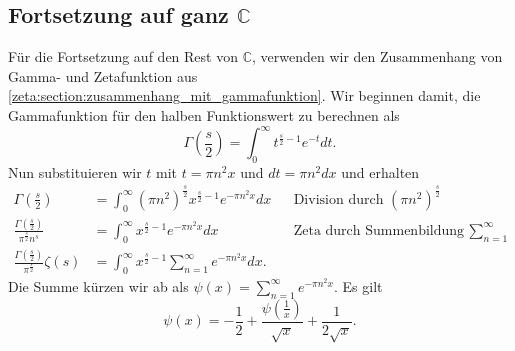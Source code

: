 \subsection{Fortsetzung auf ganz $\mathbb{C}$} \label{zeta:subsection:auf_ganz}
Für die Fortsetzung auf den Rest von $\mathbb{C}$, verwenden wir den Zusammenhang von Gamma- und Zetafunktion aus \ref{zeta:section:zusammenhang_mit_gammafunktion}.
Wir beginnen damit, die Gammafunktion für den halben Funktionswert zu berechnen als
\begin{equation}
    \Gamma \left( \frac{s}{2} \right)
    =
    \int_0^{\infty} t^{\frac{s}{2}-1} e^{-t} dt.
\end{equation}
Nun substituieren wir $t$ mit $t = \pi n^2 x$ und $dt=\pi n^2 dx$ und erhalten
\begin{align}
    \Gamma \left( \frac{s}{2} \right)
    &=
    \int_0^{\infty}
    (\pi n^2)^{\frac{s}{2}}
    x^{\frac{s}{2}-1}
    e^{-\pi n^2 x}
    dx
    && \text{Division durch } (\pi n^2)^{\frac{s}{2}}
    \\
    \frac{\Gamma \left( \frac{s}{2} \right)}{\pi^{\frac{s}{2}} n^s}
    &=
    \int_0^{\infty}
    x^{\frac{s}{2}-1}
    e^{-\pi n^2 x}
    dx
    && \text{Zeta durch Summenbildung } \sum_{n=1}^{\infty}
    \\
    \frac{\Gamma \left( \frac{s}{2} \right)}{\pi^{\frac{s}{2}}}
    \zeta(s)
    &=
    \int_0^{\infty}
    x^{\frac{s}{2}-1}
    \sum_{n=1}^{\infty}
    e^{-\pi n^2 x}
    dx. \label{zeta:equation:integral1}
\end{align}
Die Summe kürzen wir ab als $\psi(x) = \sum_{n=1}^{\infty} e^{-\pi n^2 x}$.
Es gilt
\begin{equation}\label{zeta:equation:psi}
    \psi(x)
    =
    - \frac{1}{2}
    + \frac{\psi\left(\frac{1}{x} \right)}{\sqrt{x}}
    + \frac{1}{2 \sqrt{x}}.
\end{equation}

